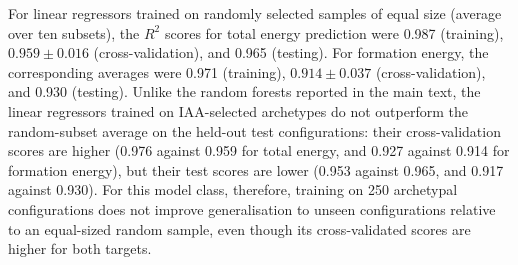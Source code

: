 \documentclass[12pt]{article}
\newcommand{\revision}[1]{{\color{red}#1}}
\begin{document}
For linear regressors trained on randomly selected samples of equal size \revision{(average over ten subsets), the $R^2$ scores for total energy prediction were 0.987 (training), $0.959 \pm 0.016$ (cross-validation), and 0.965 (testing)}. For formation energy, the corresponding averages were \revision{0.971 (training), $0.914 \pm 0.037$ (cross-validation), and 0.930 (testing). Unlike the random forests reported in the main text, the linear regressors trained on IAA-selected archetypes do not outperform the random-subset average on the held-out test configurations: their cross-validation scores are higher (0.976 against 0.959 for total energy, and 0.927 against 0.914 for formation energy), but their test scores are lower (0.953 against 0.965, and 0.917 against 0.930). For this model class, therefore, training on 250 archetypal configurations does not improve generalisation to unseen configurations relative to an equal-sized random sample, even though its cross-validated scores are higher for both targets.}



\clearpage


\end{document}
